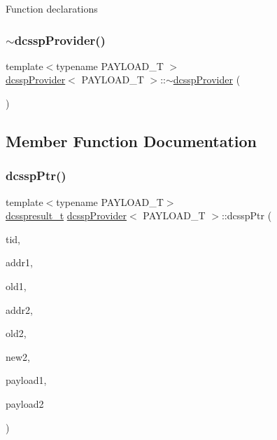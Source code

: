 Function declarations \mbox{\label{classdcsspProvider_adfef25cec973ae89775db7cb00865b15}} 
\subsubsection{\texorpdfstring{$\sim$dcssp\+Provider()}{~dcsspProvider()}}
{\footnotesize\ttfamily template$<$typename P\+A\+Y\+L\+O\+A\+D\+\_\+T $>$ \\
\hyperlink{classdcsspProvider}{dcssp\+Provider}$<$ P\+A\+Y\+L\+O\+A\+D\+\_\+T $>$\+::$\sim$\hyperlink{classdcsspProvider}{dcssp\+Provider} (\begin{DoxyParamCaption}{ }\end{DoxyParamCaption})}



\subsection{Member Function Documentation}
\mbox{\label{classdcsspProvider_ad0360a85fb59c822eac77804b3f359c4}} 
\subsubsection{\texorpdfstring{dcssp\+Ptr()}{dcsspPtr()}}
{\footnotesize\ttfamily template$<$typename P\+A\+Y\+L\+O\+A\+D\+\_\+T$>$ \\
\hyperlink{structdcsspresult__t}{dcsspresult\+\_\+t} \hyperlink{classdcsspProvider}{dcssp\+Provider}$<$ P\+A\+Y\+L\+O\+A\+D\+\_\+T $>$\+::dcssp\+Ptr (\begin{DoxyParamCaption}\item[{const int}]{tid,  }\item[{\hyperlink{rq__unsafe_8h_ad45142aaf2ff20a036dc6242b8483e9c}{casword\+\_\+t} $\ast$}]{addr1,  }\item[{\hyperlink{rq__unsafe_8h_ad45142aaf2ff20a036dc6242b8483e9c}{casword\+\_\+t}}]{old1,  }\item[{\hyperlink{rq__unsafe_8h_ad45142aaf2ff20a036dc6242b8483e9c}{casword\+\_\+t} $\ast$}]{addr2,  }\item[{\hyperlink{rq__unsafe_8h_ad45142aaf2ff20a036dc6242b8483e9c}{casword\+\_\+t}}]{old2,  }\item[{\hyperlink{rq__unsafe_8h_ad45142aaf2ff20a036dc6242b8483e9c}{casword\+\_\+t}}]{new2,  }\item[{P\+A\+Y\+L\+O\+A\+D\+\_\+T $\ast$const}]{payload1,  }\item[{P\+A\+Y\+L\+O\+A\+D\+\_\+T $\ast$const}]{payload2 }\end{DoxyParamCaption})\hspace{0.3cm}{\ttfamily [inline]}}

